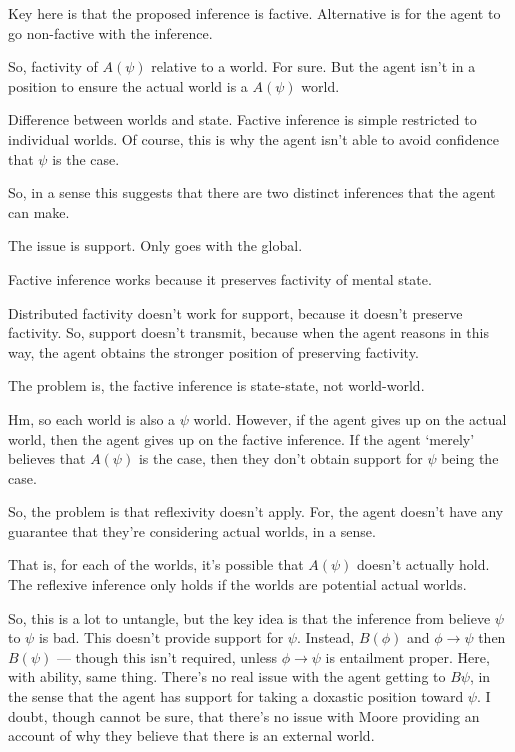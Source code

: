 \documentclass[10pt]{article}
\begin{document}
\begin{note}
  Key here is that the proposed inference is factive.
  Alternative is for the agent to go non-factive with the inference.

  So, factivity of \(A(\psi)\) relative to a world.
  For sure.
  But the agent isn't in a position to ensure the actual world is a \(A(\psi)\) world.

  Difference between worlds and state.
  Factive inference is simple restricted to individual worlds.
  Of course, this is why the agent isn't able to avoid confidence that \(\psi\) is the case.

  So, in a sense this suggests that there are two distinct inferences that the agent can make.

  The issue is support.
  Only goes with the global.

  Factive inference works because it preserves factivity of mental state.

  Distributed factivity doesn't work for support, because it doesn't preserve factivity.
  So, support doesn't transmit, because when the agent reasons in this way, the agent obtains the stronger position of preserving factivity.

  The problem is, the factive inference is state-state, not world-world.

  Hm, so each world is also a \(\psi\) world.
  However, if the agent gives up on the actual world, then the agent gives up on the factive inference.
  If the agent `merely' believes that \(A(\psi)\) is the case, then they don't obtain support for \(\psi\) being the case.

  So, the problem is that reflexivity doesn't apply.
  For, the agent doesn't have any guarantee that they're considering actual worlds, in a sense.

  That is, for each of the worlds, it's possible that \(A(\psi)\) doesn't actually hold.
  The reflexive inference only holds if the worlds are potential actual worlds.

  So, this is a lot to untangle, but the key idea is that the inference from believe \(\psi\) to \(\psi\) is bad.
  This doesn't provide support for \(\psi\).
  Instead, \(B(\phi)\) and \(\phi \rightarrow \psi\) then \(B(\psi)\) --- though this isn't required, unless \(\phi \rightarrow \psi\) is entailment proper.
  Here, with ability, same thing.
  There's no real issue with the agent getting to \(B\psi\), in the sense that the agent has support for taking a doxastic position toward \(\psi\).
  I doubt, though cannot be sure, that there's no issue with Moore providing an account of why they believe that there is an external world.
\end{note}
\end{document}
